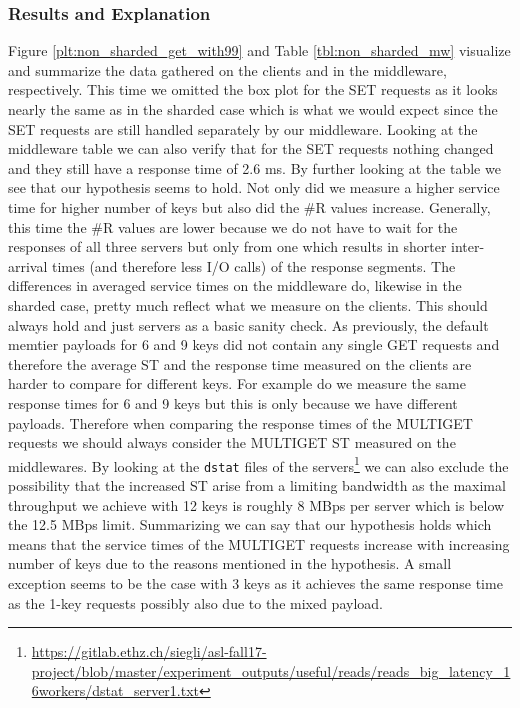 \documentclass[11pt,a4paper]{article}
\let\tt\texttt
\begin{document}
\subsubsection{Results and Explanation}
Figure \ref{plt:non_sharded_get_with99} and Table \ref{tbl:non_sharded_mw} visualize and summarize the data gathered on the clients and in the middleware, respectively. This time we omitted the box plot for the SET requests as it looks nearly the same as in the sharded case which is what we would expect since the SET requests are still handled separately by our middleware. Looking at the middleware table we can also verify that for the SET requests nothing changed and they still have a response time of 2.6 ms. By further looking at the table we see that our hypothesis seems to hold. Not only did we measure a higher service time for higher number of keys but also did the \#R values increase. Generally, this time the \#R values are lower because we do not have to wait for the responses of all three servers but only from one which results in shorter inter-arrival times (and therefore less I/O calls) of the response segments. The differences in averaged service times on the middleware do, likewise in the sharded case, pretty much reflect what we measure on the clients. This should always hold and just servers as a basic sanity check. As previously, the default memtier payloads for 6 and 9 keys did not contain any single GET requests and therefore the average ST and the response time measured on the clients are harder to compare for different keys. For example do we measure the same response times for 6  and 9 keys but this is only because we have different payloads. Therefore when comparing the response times of the MULTIGET requests we should always consider the MULTIGET ST measured on the middlewares. By looking at the \tt{dstat} files of the servers\footnote{\url{https://gitlab.ethz.ch/siegli/asl-fall17-project/blob/master/experiment_outputs/useful/reads/reads_big_latency_16workers/dstat_server1.txt}} we can also exclude the possibility that the increased ST arise from a limiting bandwidth as the maximal throughput we achieve with 12 keys is roughly 8 MBps per server which is below the 12.5 MBps limit.
Summarizing we can say that our hypothesis holds which means that the service times of the MULTIGET requests increase with increasing number of keys due to the reasons mentioned in the hypothesis. A small exception seems to be the case with 3 keys as it achieves the same response time as the 1-key requests possibly also due to the mixed payload.
\end{document}

